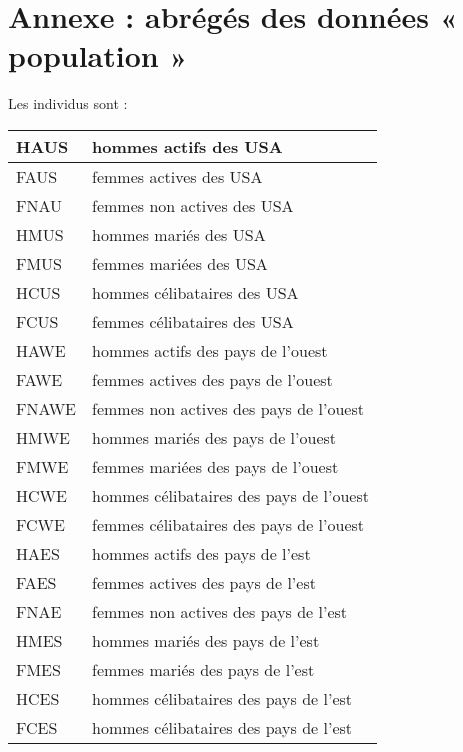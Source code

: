 \section{Annexe : abrégés des données « population »}

Les individus sont :
\begin{table}[h]
\centering
\begin{tabular}{|l|l|}
\hline
HAUS  & hommes actifs des USA                   \\ \hline
FAUS  & femmes actives des USA                  \\ \hline
FNAU  & femmes non actives des USA              \\ \hline
HMUS  & hommes mariés des USA                   \\ \hline
FMUS  & femmes mariées des USA                  \\ \hline
HCUS  & hommes célibataires des USA             \\ \hline
FCUS  & femmes célibataires des USA             \\ \hline
HAWE  & hommes actifs des pays de l'ouest       \\ \hline
FAWE  & femmes actives des pays de l'ouest      \\ \hline
FNAWE & femmes non actives des pays de l'ouest  \\ \hline
HMWE  & hommes mariés des pays de l'ouest       \\ \hline
FMWE  & femmes mariées des pays de l'ouest      \\ \hline
HCWE  & hommes célibataires des pays de l'ouest \\ \hline
FCWE  & femmes célibataires des pays de l'ouest \\ \hline
HAES  & hommes actifs des pays de l'est         \\ \hline
FAES  & femmes actives des pays de l'est        \\ \hline
FNAE  & femmes non actives des pays de l'est    \\ \hline
HMES  & hommes mariés des pays de l'est         \\ \hline
FMES  & femmes mariés des pays de l'est         \\ \hline
HCES  & hommes célibataires des pays de l'est   \\ \hline
FCES  & hommes célibataires des pays de l'est   \\ \hline

\end{tabular}
\end{table}
